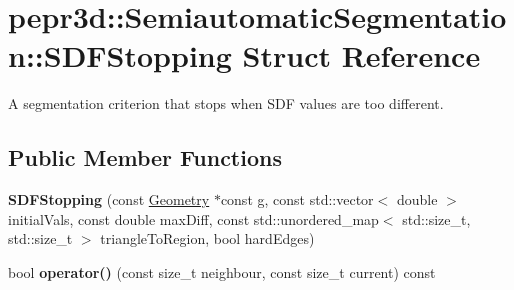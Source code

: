 \hypertarget{structpepr3d_1_1_semiautomatic_segmentation_1_1_s_d_f_stopping}{}\section{pepr3d\+::Semiautomatic\+Segmentation\+::S\+D\+F\+Stopping Struct Reference}
\label{structpepr3d_1_1_semiautomatic_segmentation_1_1_s_d_f_stopping}


A segmentation criterion that stops when S\+DF values are too different.  


\subsection*{Public Member Functions}
\begin{DoxyCompactItemize}
\item 
\mbox{\label{structpepr3d_1_1_semiautomatic_segmentation_1_1_s_d_f_stopping_a1321482ce712ee518a4012e496d65592}} 
{\bfseries S\+D\+F\+Stopping} (const \mbox{\hyperlink{classpepr3d_1_1_geometry}{Geometry}} $\ast$const g, const std\+::vector$<$ double $>$ initial\+Vals, const double max\+Diff, const std\+::unordered\+\_\+map$<$ std\+::size\+\_\+t, std\+::size\+\_\+t $>$ triangle\+To\+Region, bool hard\+Edges)
\item 
\mbox{\label{structpepr3d_1_1_semiautomatic_segmentation_1_1_s_d_f_stopping_a61e36e0c54ed8e70e7b7674010ab711e}} 
bool {\bfseries operator()} (const size\+\_\+t neighbour, const size\+\_\+t current) const
\end{DoxyCompactItemize}
